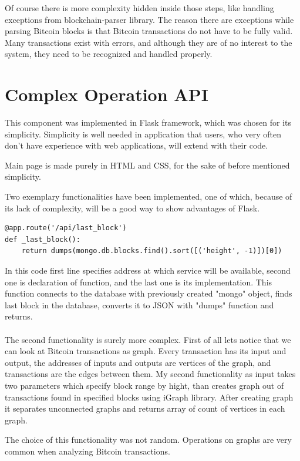 \documentclass[12pt, en, eng, oneside, final]{mgr}
\begin{document}
Of course there is more complexity hidden inside those steps, like handling exceptions from blockchain-parser library. The reason there are exceptions while parsing Bitcoin blocks is that Bitcoin transactions do not have to be fully valid. Many transactions exist with errors, and although they are of no interest to the system, they need to be recognized and handled properly.

\section{Complex Operation API}
This component was implemented in Flask framework\cite{flask-web-page}, which was chosen for its simplicity. Simplicity is well needed in application that users, who very often don't have experience with web applications, will extend with their code. 

Main page is made purely in HTML and CSS, for the sake of before mentioned simplicity.

Two exemplary functionalities have been implemented, one of which, because of its lack of complexity, will be a good way to show advantages of Flask.
\begin{verbatim}
@app.route('/api/last_block')
def _last_block():
    return dumps(mongo.db.blocks.find().sort([('height', -1)])[0])
\end{verbatim}
In this code first line specifies address at which service will be available, second one is declaration of function, and the last one is its implementation. This function connects to the database with previously created "mongo" object, finds last block in the database, converts it to JSON with "dumps" function and returns.
\\
\\
The second functionality is surely more complex. First of all lets notice that we can look at Bitcoin transactions as graph. Every transaction has its input and output, the addresses of inputs and outputs are vertices of the graph, and transactions are the edges between them. My second functionality as input takes two parameters which specify block range by hight, than creates graph out of transactions found in specified blocks using iGraph\cite{igraph} library. After creating graph it separates unconnected graphs and returns array of count of vertices in each graph.

The choice of this functionality was not random. Operations on graphs are very common when analyzing Bitcoin transactions.
\end{document}
